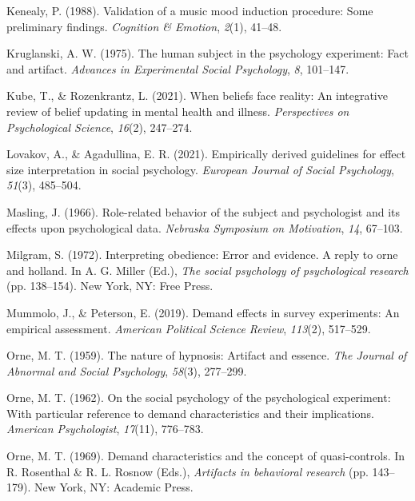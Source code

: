 \documentclass[
  man,floatsintext]{apa6}
\newlength{\cslhangindent}
\newlength{\cslentryspacingunit} %
\newenvironment{CSLReferences}[2] %
 {%
  \setlength{\parindent}{0pt}
  \ifodd #1
  \let\oldpar\par
  \def\par{\hangindent=\cslhangindent\oldpar}
  \fi
  \setlength{\parskip}{#2\cslentryspacingunit}
 }%
 {}
\begin{document}
\begin{CSLReferences}{1}{0}
\leavevmode{}%
Kenealy, P. (1988). Validation of a music mood induction procedure: Some preliminary findings. \emph{Cognition \& Emotion}, \emph{2}(1), 41--48.

\leavevmode{}%
Kruglanski, A. W. (1975). The human subject in the psychology experiment: Fact and artifact. \emph{Advances in Experimental Social Psychology}, \emph{8}, 101--147.

\leavevmode{}%
Kube, T., \& Rozenkrantz, L. (2021). When beliefs face reality: An integrative review of belief updating in mental health and illness. \emph{Perspectives on Psychological Science}, \emph{16}(2), 247--274.

\leavevmode{}%
Lovakov, A., \& Agadullina, E. R. (2021). Empirically derived guidelines for effect size interpretation in social psychology. \emph{European Journal of Social Psychology}, \emph{51}(3), 485--504.

\leavevmode{}%
Masling, J. (1966). Role-related behavior of the subject and psychologist and its effects upon psychological data. \emph{Nebraska Symposium on Motivation}, \emph{14}, 67--103.

\leavevmode{}%
Milgram, S. (1972). Interpreting obedience: Error and evidence. A reply to orne and holland. In A. G. Miller (Ed.), \emph{The social psychology of psychological research} (pp. 138--154). New York, NY: Free Press.

\leavevmode{}%
Mummolo, J., \& Peterson, E. (2019). Demand effects in survey experiments: An empirical assessment. \emph{American Political Science Review}, \emph{113}(2), 517--529.

\leavevmode{}%
Orne, M. T. (1959). The nature of hypnosis: Artifact and essence. \emph{The Journal of Abnormal and Social Psychology}, \emph{58}(3), 277--299.

\leavevmode{}%
Orne, M. T. (1962). On the social psychology of the psychological experiment: With particular reference to demand characteristics and their implications. \emph{American Psychologist}, \emph{17}(11), 776--783.

\leavevmode{}%
Orne, M. T. (1969). Demand characteristics and the concept of quasi-controls. In R. Rosenthal \& R. L. Rosnow (Eds.), \emph{Artifacts in behavioral research} (pp. 143--179). New York, NY: Academic Press.


\end{CSLReferences}
\end{document}
